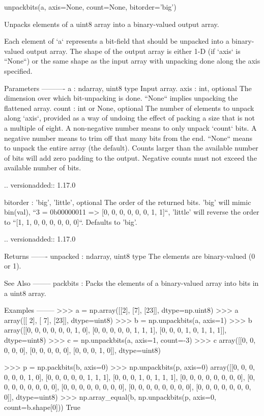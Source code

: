 \begin{DoxyVerb}unpackbits(a, axis=None, count=None, bitorder='big')

Unpacks elements of a uint8 array into a binary-valued output array.

Each element of `a` represents a bit-field that should be unpacked
into a binary-valued output array. The shape of the output array is
either 1-D (if `axis` is ``None``) or the same shape as the input
array with unpacking done along the axis specified.

Parameters
----------
a : ndarray, uint8 type
   Input array.
axis : int, optional
    The dimension over which bit-unpacking is done.
    ``None`` implies unpacking the flattened array.
count : int or None, optional
    The number of elements to unpack along `axis`, provided as a way
    of undoing the effect of packing a size that is not a multiple
    of eight. A non-negative number means to only unpack `count`
    bits. A negative number means to trim off that many bits from
    the end. ``None`` means to unpack the entire array (the
    default). Counts larger than the available number of bits will
    add zero padding to the output. Negative counts must not
    exceed the available number of bits.

    .. versionadded:: 1.17.0

bitorder : {'big', 'little'}, optional
    The order of the returned bits. 'big' will mimic bin(val),
    ``3 = 0b00000011 => [0, 0, 0, 0, 0, 0, 1, 1]``, 'little' will reverse
    the order to ``[1, 1, 0, 0, 0, 0, 0, 0]``.
    Defaults to 'big'.

    .. versionadded:: 1.17.0

Returns
-------
unpacked : ndarray, uint8 type
   The elements are binary-valued (0 or 1).

See Also
--------
packbits : Packs the elements of a binary-valued array into bits in
           a uint8 array.

Examples
--------
>>> a = np.array([[2], [7], [23]], dtype=np.uint8)
>>> a
array([[ 2],
       [ 7],
       [23]], dtype=uint8)
>>> b = np.unpackbits(a, axis=1)
>>> b
array([[0, 0, 0, 0, 0, 0, 1, 0],
       [0, 0, 0, 0, 0, 1, 1, 1],
       [0, 0, 0, 1, 0, 1, 1, 1]], dtype=uint8)
>>> c = np.unpackbits(a, axis=1, count=-3)
>>> c
array([[0, 0, 0, 0, 0],
       [0, 0, 0, 0, 0],
       [0, 0, 0, 1, 0]], dtype=uint8)

>>> p = np.packbits(b, axis=0)
>>> np.unpackbits(p, axis=0)
array([[0, 0, 0, 0, 0, 0, 1, 0],
       [0, 0, 0, 0, 0, 1, 1, 1],
       [0, 0, 0, 1, 0, 1, 1, 1],
       [0, 0, 0, 0, 0, 0, 0, 0],
       [0, 0, 0, 0, 0, 0, 0, 0],
       [0, 0, 0, 0, 0, 0, 0, 0],
       [0, 0, 0, 0, 0, 0, 0, 0],
       [0, 0, 0, 0, 0, 0, 0, 0]], dtype=uint8)
>>> np.array_equal(b, np.unpackbits(p, axis=0, count=b.shape[0]))
True\end{DoxyVerb}
 \mbox{\label{namespacenumpy_1_1core_1_1multiarray_aa4db85fae51a0e6ca2240e6a33cce469}} 
